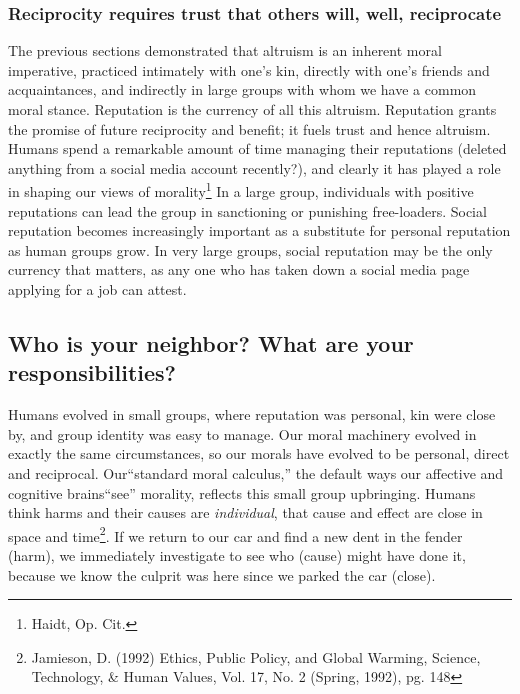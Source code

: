 \subsubsection{Reciprocity requires trust that others will, well, reciprocate}
The previous sections demonstrated that altruism is an inherent moral imperative, practiced intimately with one's kin, directly with one's friends and acquaintances, and indirectly in large groups with whom we have a common moral stance. Reputation is the currency of all this altruism. Reputation grants the promise of future reciprocity and benefit; it fuels trust and hence altruism. Humans spend a remarkable amount of time managing their reputations (deleted anything from a social media account recently?), and clearly it has played a role in shaping our views of morality\footnote{Haidt, Op. Cit.} In a large group, individuals with positive reputations can lead the group in sanctioning or punishing free-loaders. Social reputation becomes increasingly important as a substitute for personal reputation as human groups grow. In very large groups, social reputation may be the only currency that matters, as any one who has taken down a social media page applying for a job can attest.

\subsection{Who is your neighbor? What are your responsibilities?}
Humans evolved in small groups, where reputation was personal, kin were close by, and group identity was easy to manage. Our moral machinery evolved in exactly the same circumstances, so our morals have evolved to be personal, direct and reciprocal. Our``standard moral calculus,'' the default ways our affective and cognitive brains``see'' morality, reflects this small group upbringing. Humans think harms and their causes are \emph{individual}, that cause and effect are close in space and time\footnote{Jamieson, D. (1992) Ethics, Public Policy, and Global Warming, Science, Technology, \& Human Values, Vol. 17, No. 2 (Spring, 1992), pg. 148}. If we return to our car and find a new dent in the fender (harm), we immediately investigate to see who (cause) might have done it, because we know the culprit was here since we parked the car (close).\\

